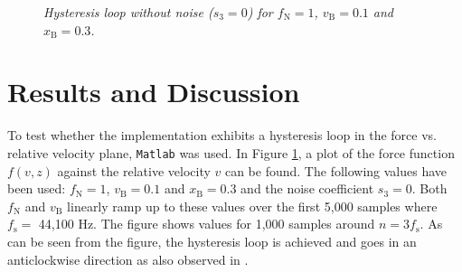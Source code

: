 \documentclass[twoside,a4paper,dvipsnames]{article}
\begin{document}
\begin{figure}[h]
  \centering
  \caption{\it Hysteresis loop without noise ($s_3 = 0$) for $f_\text{N} = 1$, $v_\text{B} = 0.1$ and $x_\text{B} = 0.3$. \label{fig:hysteresis}}
\end{figure}

\section{Results and Discussion}\label{sec:results}
To test whether the implementation exhibits a hysteresis loop in the force vs. relative velocity plane, \texttt{Matlab} was used. In Figure \ref{fig:hysteresis}, a plot of the force function $f(v,z)$ against the relative velocity $v$ can be found.  The following values have been used: $f_\text{N} = 1$, $v_\text{B} = 0.1$ and $x_\text{B} = 0.3$ and the noise coefficient $s_3=0$. Both $f_\text{N}$ and $v_\text{B}$ linearly ramp up to these values over the first 5,000 samples where $f_\text{s} =$ 44,100 Hz. The figure shows values for 1,000 samples around $n = 3f_\text{s}$. As can be seen from the figure, the hysteresis loop is achieved and goes in an anticlockwise direction as also observed in \cite{Smith2000}.
\end{document}
